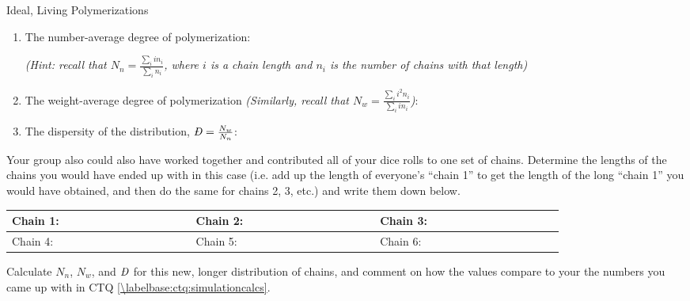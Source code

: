 \begin{activity}{Ideal, Living Polymerizations}
\begin{ctqs}
		\begin{enumerate}
			\item The number-average degree of polymerization:
			
				\emph{(Hint: recall that $N_n = \frac{\sum_i i n_i}{\sum_i n_i}$, where $i$ is a chain length and $n_i$ is the number of chains with that length)}
			
				\begin{solution}[2in]
				\end{solution}
			
			\clearpage
			\item The weight-average degree of polymerization \emph{(Similarly, recall that $N_w= \frac{\sum_i i^2 n_i}{\sum_i i n_i}$)}:
			
				\begin{solution}[1.5in]
				\end{solution}
			
			\item The dispersity of the distribution, $\PDImath = \frac{N_w}{N_n}$:
			
				\begin{solution}[1in]
				\end{solution}
			
		\end{enumerate}
		
	\question Your group also could also have worked together and contributed all of your dice rolls to one set of chains.  Determine the lengths of the chains you would have ended up with in this case (i.e. add up the length of everyone's ``chain 1'' to get the length of the long ``chain 1'' you would have obtained, and then do the same for chains 2, 3, etc.) and write them down below.
		
		\begin{center}
			\renewcommand{\arraystretch}{2.5}
			\begin{tabular}{|l|c|l|c|l|c|}
				\hline
				Chain 1: & ~~~~~~~~~~~~~~~~~~ & Chain 2: & ~~~~~~~~~~~~~~~~~~  & Chain 3: & ~~~~~~~~~~~~~~~~~~  \\\hline
				Chain 4: & ~~~~~~~~~~~~~~~~~~ & Chain 5: & ~~~~~~~~~~~~~~~~~~  & Chain 6: & ~~~~~~~~~~~~~~~~~~  \\\hline
			\end{tabular}
		\end{center}
		
	\question Calculate $N_n$, $N_w$, and $\PDImath$ for this new, longer distribution of chains, and comment on how the values compare to your the numbers you came up with in CTQ \ref{\labelbase:ctq:simulationcalcs}.
			

\end{ctqs}
\end{activity}
